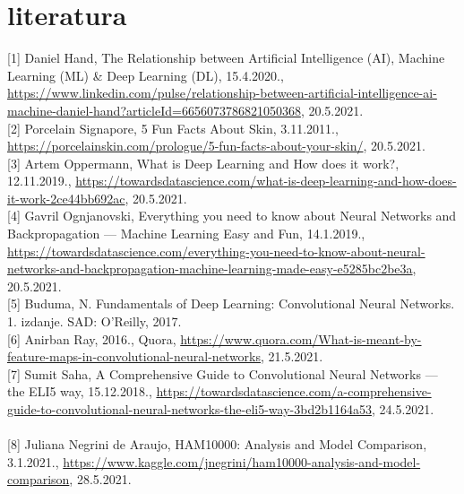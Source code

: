\documentclass[times, utf8, zavrsni]{fer}
\begin{document}
%
%

\chapter{literatura}

\noindent{}[1] Daniel Hand, The Relationship between Artificial Intelligence (AI), Machine Learning (ML) \& Deep Learning (DL), 15.4.2020., \url{https://www.linkedin.com/pulse/relationship-between-artificial-intelligence-ai-machine-daniel-hand?articleId=6656073786821050368}, 20.5.2021.\\

\noindent{}[2] Porcelain Signapore, 5 Fun Facts About Skin, 3.11.2011., \url{https://porcelainskin.com/prologue/5-fun-facts-about-your-skin/}, 20.5.2021.\\

\noindent{}[3] Artem Oppermann, What is Deep Learning and How does it work?, 12.11.2019., \url{https://towardsdatascience.com/what-is-deep-learning-and-how-does-it-work-2ce44bb692ac}, 20.5.2021.\\

\noindent{}[4] Gavril Ognjanovski, Everything you need to know about Neural Networks and Backpropagation — Machine Learning Easy and Fun, 14.1.2019., \url{https://towardsdatascience.com/everything-you-need-to-know-about-neural-networks-and-backpropagation-machine-learning-made-easy-e5285bc2be3a}, 20.5.2021.\\

\noindent{}[5] Buduma, N. Fundamentals of Deep Learning: Convolutional Neural Networks. 1. izdanje. SAD: O'Reilly, 2017.\\

\noindent{}[6] Anirban Ray, 2016., Quora, \url{https://www.quora.com/What-is-meant-by-feature-maps-in-convolutional-neural-networks}, 21.5.2021.\\

\noindent{}[7] Sumit Saha, A Comprehensive Guide to Convolutional Neural Networks — the ELI5 way, 15.12.2018., \url{https://towardsdatascience.com/a-comprehensive-guide-to-convolutional-neural-networks-the-eli5-way-3bd2b1164a53}, 24.5.2021.\\\\

\noindent{}[8] Juliana Negrini de Araujo, HAM10000: Analysis and Model Comparison, 3.1.2021., \url{https://www.kaggle.com/jnegrini/ham10000-analysis-and-model-comparison}, 28.5.2021.\\
\end{document}
